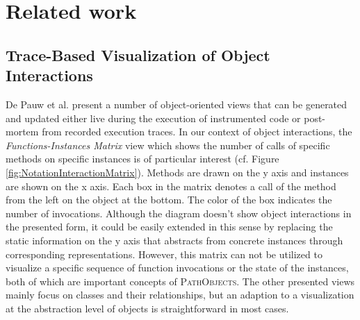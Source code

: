 \chapter{Related work}
\label{c:relatedwork}


\section[Trace-Based Visualization of Object Interactions]{Trace-Based Visualization of Object Interactions%
}

De Pauw et al. present a number of object-oriented views \cite{de_pauw_visualizing_1993, tokoro_modeling_1994} that can be generated and updated either live during the execution of instrumented code or post-mortem from recorded execution traces.
In our context of object interactions, the \emph{Functions-Instances Matrix} view  which shows the number of calls of specific methods on specific instances is of particular interest (cf. Figure \ref{fig:NotationInteractionMatrix}).
Methods are drawn on the y axis and instances are shown on the x axis.
Each box in the matrix denotes a call of the method from the left on the object at the bottom.
The color of the box indicates the number of invocations.
Although the diagram doesn't show object interactions in the presented form, it could be easily extended in this sense by replacing the static information on the y axis that abstracts from concrete instances through corresponding representations.
However, this matrix can not be utilized to visualize a specific sequence of function invocations or the state of the instances, both of which are important concepts of \textsc{PathObjects}.
The other presented views mainly focus on classes and their relationships, but an adaption to a visualization at the abstraction level of objects is straightforward in most cases.

